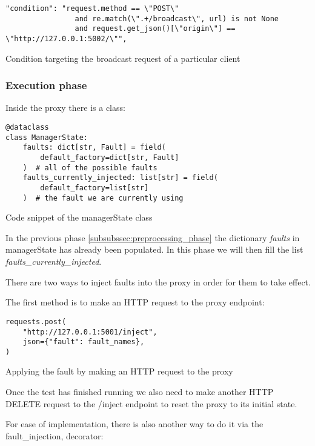 \begin{listing}[!ht]
  \begin{verbatim}
"condition": "request.method == \"POST\" 
                and re.match(\".+/broadcast\", url) is not None  
                and request.get_json()[\"origin\"] == \"http://127.0.0.1:5002/\"",
  \end{verbatim}
  \caption{Condition targeting the broadcast request of a particular client}
\end{listing}

\subsubsection{Execution phase}

Inside the proxy there is a class: 
\begin{listing}[!ht]
  \begin{verbatim}
@dataclass
class ManagerState:
    faults: dict[str, Fault] = field(
        default_factory=dict[str, Fault]
    )  # all of the possible faults
    faults_currently_injected: list[str] = field(
        default_factory=list[str]
    )  # the fault we are currently using
  \end{verbatim}
  \caption{Code snippet of the managerState class}
  \label{code:managerState}
\end{listing}

In the previous phase \ref{subsubssec:preprocessing_phase} the dictionary \textit{faults}
in managerState has already been populated. In this phase we will then fill 
the list \textit{faults\_currently\_injected}.

There are two ways to inject faults into the proxy in order for them to take effect.

The first method is to make an HTTP request to the proxy endpoint: 

\begin{listing}[!ht]
  \begin{verbatim}
requests.post(
    "http://127.0.0.1:5001/inject",
    json={"fault": fault_names},
)
  \end{verbatim}
  \caption{Applying the fault by making an HTTP request to the proxy}
\end{listing}

Once the test has finished running we also need to make another HTTP DELETE request
to the /inject endpoint to reset the proxy to its initial state.

For ease of implementation, there is also another way to do it via the fault\_injection, 
decorator:

